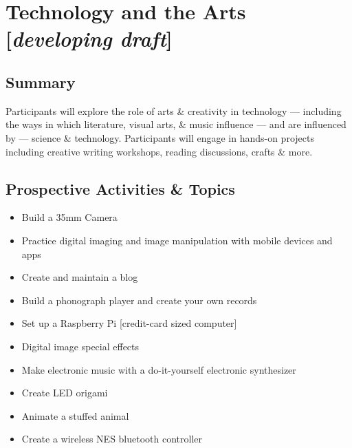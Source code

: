 \documentclass[letterpaper,10pt,english]{sphinxmanual}
\begin{document}
\chapter{Technology and the Arts {[}\emph{developing draft}{]}}
\label{arts::doc}\label{arts:index-0}\label{arts:technology-and-the-arts-developing-draft}

\section{Summary}
\label{arts:summary}
Participants will explore the role of arts \& creativity in technology — including the ways in which literature, visual arts, \& music influence — and are influenced by — science \& technology. Participants will engage in hands-on projects including creative writing workshops, reading discussions, crafts \& more.


\section{Prospective Activities \& Topics}
\label{arts:prospective-activities-topics}\begin{itemize}
\item {} 
Build a 35mm Camera

\item {} 
Practice digital imaging and image manipulation with mobile devices and apps

\item {} 
Create and maintain a blog

\item {} 
Build a phonograph player and create your own records

\item {} 
Set up a Raspberry Pi {[}credit-card sized computer{]}

\item {} 
Digital image special effects

\item {} 
Make electronic music with a do-it-yourself electronic synthesizer

\item {} 
Create LED origami

\item {} 
Animate a stuffed animal

\item {} 
Create a wireless NES bluetooth controller

\end{itemize}
\end{document}
